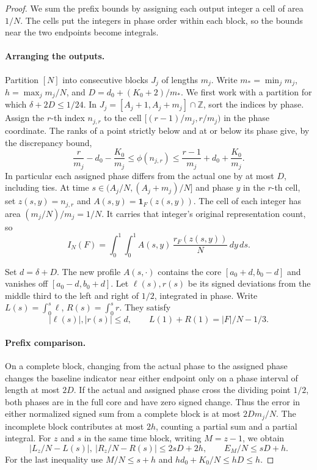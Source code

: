 \documentclass[11pt,reqno]{amsart}
\newcommand{\Z}{\mathbb Z}
\newcommand{\ind}{\mathbf 1}
\numberwithin{equation}{section}
\begin{document}
\begin{proof}
We sum the prefix bounds by assigning each output integer a cell
of area \(1/N\). The cells put the integers in phase order within
each block, so the bounds near the two endpoints become integrals.

\paragraph{Arranging the outputs.}
Partition \([N]\) into consecutive blocks \(J_j\) of lengths \(m_j\).
Write \(m_*=\min_jm_j\), \(h=\max_j m_j/N\),
and \(D=d_0+(K_0+2)/m_*\). We first work with a partition
for which \(\delta+2D\le1/24\).
In \(J_j=[A_j+1,A_j+m_j]\cap\Z\), sort the indices by phase.
Assign the \(r\)-th index \(n_{j,r}\) to the cell
\([(r-1)/m_j,r/m_j)\) in the phase coordinate.
The ranks of a point strictly below and at or below its phase
give, by the discrepancy bound,
\[
 \frac{r}{m_j}-d_0-\frac{K_0}{m_j}
 \le \phi(n_{j,r})
 \le\frac{r-1}{m_j}+d_0+\frac{K_0}{m_j}.
\]
In particular each assigned phase differs from the actual one
by at most \(D\), including ties.
At time \(s\in(A_j/N,(A_j+m_j)/N]\) and phase \(y\) in the
\(r\)-th cell, set \(z(s,y)=n_{j,r}\) and
\(A(s,y)=\ind_F(z(s,y))\).
The cell of each integer has area \((m_j/N)/m_j=1/N\).
It carries that integer's original representation count, so
\begin{equation}\label{eq:cell-triples}
 I_N(F)=\int_0^1\int_0^1 A(s,y)\,\frac{r_F(z(s,y))}{N}\,dy\,ds .
\end{equation}

Set \(d=\delta+D\). The new profile \(A(s,\cdot)\) contains
the core \([a_0+d,b_0-d]\) and vanishes off \([a_0-d,b_0+d]\).
Let \(\ell(s),r(s)\) be its signed deviations from the middle
third to the left and right of \(1/2\), integrated in phase.
Write \(L(s)=\int_0^s\ell\), \(R(s)=\int_0^s r\).
They satisfy
\begin{equation}\label{eq:profile-mass}
 |\ell(s)|,|r(s)|\le d,\qquad
 L(1)+R(1)=|F|/N-1/3 .
\end{equation}

\paragraph{Prefix comparison.}
On a complete block, changing from the actual phase to the
assigned phase changes the baseline indicator near either
endpoint only on a phase interval of length at most \(2D\).
If the actual and assigned phase cross the dividing point \(1/2\),
both phases are in the full core and have zero signed change.
Thus the error in either normalized signed sum from a complete
block is at most \(2Dm_j/N\).
The incomplete block contributes at most \(2h\), counting
a partial sum and a partial integral. For \(z\) and \(s\) in the
same time block, writing \(M=z-1\), we obtain
\begin{equation}\label{eq:prefix-errors}
 |L_z/N-L(s)|,\ |R_z/N-R(s)|\le 2sD+2h,\qquad
 E_M/N\le sD+h .
\end{equation}
For the last inequality use \(M/N\le s+h\) and
\(hd_0+K_0/N\le hD\le h\).


\end{proof}
\end{document}
